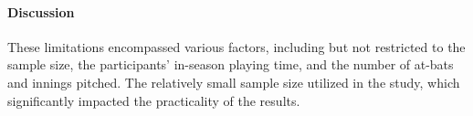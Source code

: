 \documentclass[12pt]{article}
\begin{document}
\paragraph{Discussion}
These limitations encompassed various factors, including but not restricted to the sample size, the participants' in-season playing time,
and the number of at-bats and innings pitched. The relatively small sample size utilized in the study, which significantly impacted the practicality of the results.





\end{document}
